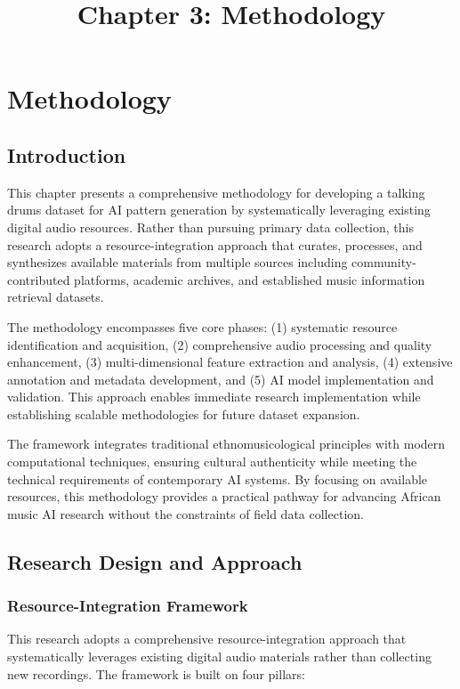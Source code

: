\documentclass[12pt]{article}
\title{Chapter 3: Methodology}
\author{}
\date{}
\begin{document}
\chapter{Methodology}

\section{Introduction}

This chapter presents a comprehensive methodology for developing a talking drums dataset for AI pattern generation by systematically leveraging existing digital audio resources. Rather than pursuing primary data collection, this research adopts a resource-integration approach that curates, processes, and synthesizes available materials from multiple sources including community-contributed platforms, academic archives, and established music information retrieval datasets.

The methodology encompasses five core phases: (1) systematic resource identification and acquisition, (2) comprehensive audio processing and quality enhancement, (3) multi-dimensional feature extraction and analysis, (4) extensive annotation and metadata development, and (5) AI model implementation and validation. This approach enables immediate research implementation while establishing scalable methodologies for future dataset expansion.

The framework integrates traditional ethnomusicological principles with modern computational techniques, ensuring cultural authenticity while meeting the technical requirements of contemporary AI systems. By focusing on available resources, this methodology provides a practical pathway for advancing African music AI research without the constraints of field data collection.

\section{Research Design and Approach}

\subsection{Resource-Integration Framework}

This research adopts a comprehensive resource-integration approach that systematically leverages existing digital audio materials rather than collecting new recordings. The framework is built on four pillars:
\end{document}
